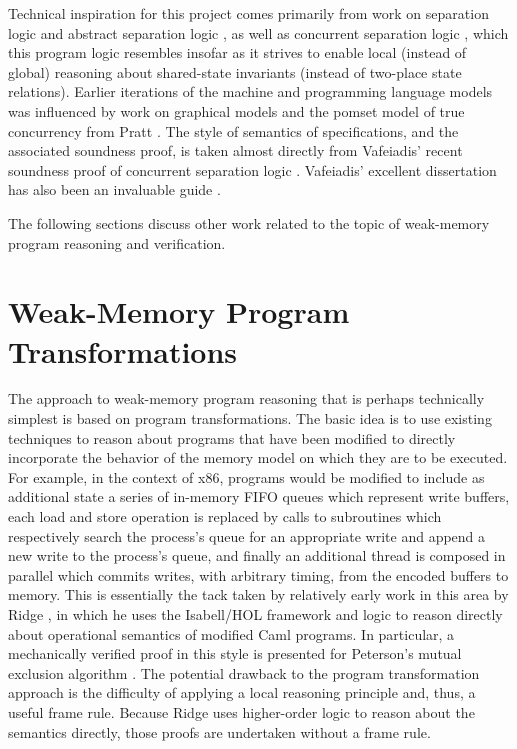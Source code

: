 \documentclass[11pt]{report}         %
\begin{document}
Technical inspiration for this project comes primarily from work on separation logic \cite{DBLP:conf/lics/Reynolds02,DBLP:conf/csl/OHearnRY01,DBLP:journals/bsl/OHearnP99} and abstract separation logic \cite{DBLP:conf/lics/CalcagnoOY07}, as well as concurrent separation logic  \cite{DBLP:journals/tcs/OHearn07,DBLP:journals/tcs/Brookes07}, which this program logic resembles insofar as it strives to enable local (instead of global) reasoning about shared-state invariants (instead of two-place state relations). Earlier iterations of the machine and programming language models was influenced by work on graphical models \cite{DBLP:journals/ipl/WehrmanHO09,DBLP:conf/RelMiCS/HoareMSW09,DBLP:journals/jlp/HoareMSW11} and the pomset model of true concurrency from Pratt \cite{DBLP:conf/popl/Pratt82,DBLP:conf/concur/Pratt84}. The style of semantics of specifications, and the associated soundness proof, is taken almost directly from Vafeiadis' recent soundness proof of concurrent separation logic \cite{V11}. Vafeiadis' excellent dissertation has also been an invaluable guide \cite{VafeiadisDissertation}. 

The following sections discuss other work related to the topic of weak-memory program reasoning and verification. 

\section{Weak-Memory Program Transformations}
\label{sec:program-transformations}

The approach to weak-memory program reasoning that is perhaps technically simplest is based on program transformations. The basic idea is to use existing techniques to reason about programs that have been modified to directly incorporate the behavior of the memory model on which they are to be executed. For example, in the context of x86, programs would be modified to include as additional state a series of in-memory FIFO queues which represent write buffers, each load and store operation is replaced by calls to subroutines which respectively search the process's queue for an appropriate write and append a new write to the process's queue, and finally an additional thread is composed in parallel which commits writes, with arbitrary timing, from the encoded buffers to memory. This is essentially the tack taken by relatively early work in this area by Ridge \cite{DBLP:conf/tphol/Ridge07}, in which he uses the Isabell/HOL framework and logic to reason directly about operational semantics of modified Caml programs. In particular, a mechanically verified proof in this style is presented for Peterson's mutual exclusion algorithm \cite{DBLP:journals/ipl/Peterson81}. The potential drawback to the program transformation approach is the difficulty of applying a local reasoning principle and, thus, a useful frame rule. Because Ridge uses higher-order logic to reason about the semantics directly, those proofs are undertaken without a frame rule. 
\end{document}
